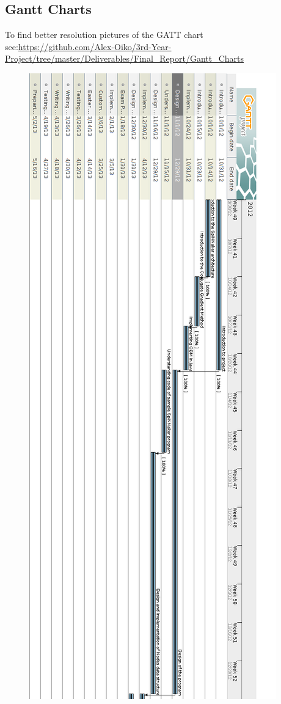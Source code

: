 \documentclass[12pt,a4paper]{article}
\begin{document}
\subsection{Gantt Charts}
To find better resolution pictures of the GATT chart see:\url{https://github.com/Alex-Oiko/3rd-Year-Project/tree/master/Deliverables/Final_Report/Gantt_Charts} \cite{git_repo}
\topmargin=0pt
\voffset=0pt
\begin{figure}[h!]
\includegraphics[scale=0.4]{Gantt_Charts/Final_Gantt1.png}
\centering
\end{figure}
\end{document}
